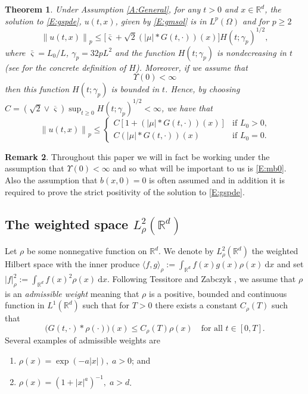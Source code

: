 \documentclass[a4paper,11pt]{article}
\numberwithin{equation}{section}
\theoremstyle{plain}
\newtheorem{theorem}{Theorem}[section]
\theoremstyle{definition}
\newtheorem{remark}[theorem]{Remark}
\newcommand{\R}{\mathbb{R}}
\newcommand{\Norm}[1]{\left\|  #1   \right\|}
\newcommand{\ud}{\ensuremath{\mathrm{d}}}
\begin{document}
\begin{theorem} 
	\label{T:ExUn}
	Under Assumption \ref{A:General}, for any $t>0$ and $x \in \R^d$, the solution to \eqref{E:gspde}, $u(t,x)$,
	given by \eqref{E:gmsol} is in $L^p(\Omega)$ and for $p\ge 2$
	\begin{equation}
		\label{E:mb}
		\Norm{u(t,x)}_p \le \big[\bar{\varsigma}+\sqrt{2}(|\mu|*G(t,\cdot))(x)\big]H(t;\gamma_p)^{1/2},
	\end{equation}
	where $\bar{\varsigma}=L_0/L$, $\gamma_p = 32pL^2$ and the function $H(t;\gamma_p)$ is nondecreasing in $t$ (see \cite{CH16Comparison} for
	the concrete definition of $H$).
	Moreover, if we assume that
	\begin{equation}
		 \Upsilon(0) < \infty \label{A:dalcon0}
	\end{equation}
	then this function $H(t;\gamma_p)$ is bounded in $t$. Hence, by choosing 
	$C=\left(\sqrt{2}\vee \overline{\varsigma}\right)\sup_{t\ge 0} H(t;\gamma_p)^{1/2}<\infty$, 
	we have that
	\begin{equation}
		\label{E:mb0}
		\Norm{u(t,x)}_p \le 
		\begin{cases}
			C\left[1+\left(|\mu|*G(t,\cdot)\right)(x)\right] & \text{if $L_0> 0$,}\\
			C\left(|\mu|*G(t,\cdot)\right)(x) & \text{if $L_0= 0$}.
		\end{cases}
	\end{equation} 
\end{theorem}

\begin{remark} 
	Throughout this paper we will in fact be working under the assumption that $\Upsilon(0) < \infty$ and so what
	will be important to us is \eqref{E:mb0}. Also the assumption that $b(x,0)=0$ is often assumed and in addition
	it is required to prove the strict positivity \cite{CH16Comparison} of the solution to \eqref{E:gspde}. 
\end{remark}

\subsection{The weighted space $L^2_\rho(\R^d)$}

Let $\rho$ be some nonnegative function on $\R^d$. 
We denote by $L^2_\rho(\R^d)$ the weighted Hilbert space with the inner produce $\langle f,g \rangle_\rho  :=
\int_{\R^d}f(x)g(x)\rho(x) \: \ud x$ and set $|f|_\rho^2 :=\int_{\R^d}f(x)^2\rho(x) \: \ud x$.
Following Tessitore and Zabczyk \cite{TessitoreZabczyk98M}, we assume that $\rho$ is an \textit{admissible weight}
meaning that $\rho$ is a positive, bounded and continuous function in $L^1(\R^d)$ such that for $T>0$ there exists a
constant $C_\rho(T)$ such that 
\begin{equation}
	\big(G(t,\cdot)*\rho(\cdot)\big)(x) \le C_\rho(T) \rho(x) \quad \text{for all $t\in[0,T]$.} \label{E:aw}
\end{equation}   
Several examples of admissible weights are 
\begin{enumerate}
	\item $\rho(x)=\exp(-a|x|), \; a>0$; and
	\item $\rho(x) = (1+|x|^a)^{-1}, \; a>d$.
\end{enumerate}
\end{document}
